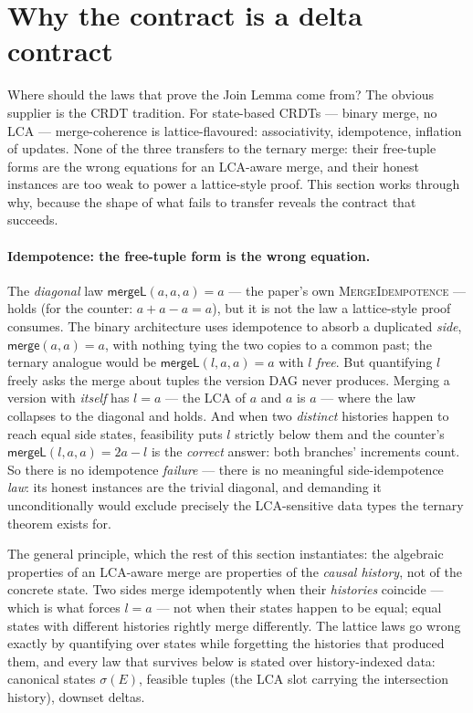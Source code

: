 \documentclass[11pt]{article}
\newcommand{\Merge}{\mathsf{merge}}
\newcommand{\mergeL}{\mathsf{mergeL}}
\begin{document}
\section{Why the contract is a delta contract}
\label{sec:whydelta}

Where should the laws that prove the Join Lemma come from? The obvious
supplier is the CRDT tradition. For state-based CRDTs --- binary merge,
no LCA --- merge-coherence is lattice-flavoured: associativity,
idempotence, inflation of updates. None of the three transfers to the
ternary merge: their free-tuple forms are the wrong equations for an
LCA-aware merge, and their honest instances are too weak to power a
lattice-style proof. This section works through why, because the shape
of what fails to transfer reveals the contract that succeeds.

\paragraph{Idempotence: the free-tuple form is the wrong equation.}
The \emph{diagonal} law $\mergeL(a,a,a) = a$ --- the paper's own
\textsc{MergeIdempotence} --- holds (for the counter: $a + a - a = a$),
but it is not the law a lattice-style proof consumes. The binary
architecture uses idempotence to absorb a duplicated \emph{side},
$\Merge(a,a) = a$, with nothing tying the two copies to a common past;
the ternary analogue would be $\mergeL(l,a,a) = a$ with $l$ \emph{free}.
But quantifying $l$ freely asks the merge about tuples the version DAG
never produces. Merging a version with \emph{itself} has $l = a$ --- the
LCA of $a$ and $a$ is $a$ --- where the law collapses to the diagonal
and holds. And when two \emph{distinct} histories happen to reach equal
side states, feasibility puts $l$ strictly below them and the counter's
$\mergeL(l,a,a) = 2a - l$ is the \emph{correct} answer: both branches'
increments count. So there is no idempotence \emph{failure} --- there is
no meaningful side-idempotence \emph{law}: its honest instances are the
trivial diagonal, and demanding it unconditionally would exclude
precisely the LCA-sensitive data types the ternary theorem exists for.

The general principle, which the rest of this section instantiates: the
algebraic properties of an LCA-aware merge are properties of the
\emph{causal history}, not of the concrete state. Two sides merge
idempotently when their \emph{histories} coincide --- which is what
forces $l = a$ --- not when their states happen to be equal; equal
states with different histories rightly merge differently. The lattice
laws go wrong exactly by quantifying over states while forgetting the
histories that produced them, and every law that survives below is
stated over history-indexed data: canonical states $\sigma(E)$, feasible
tuples (the LCA slot carrying the intersection history), downset deltas.
\end{document}
